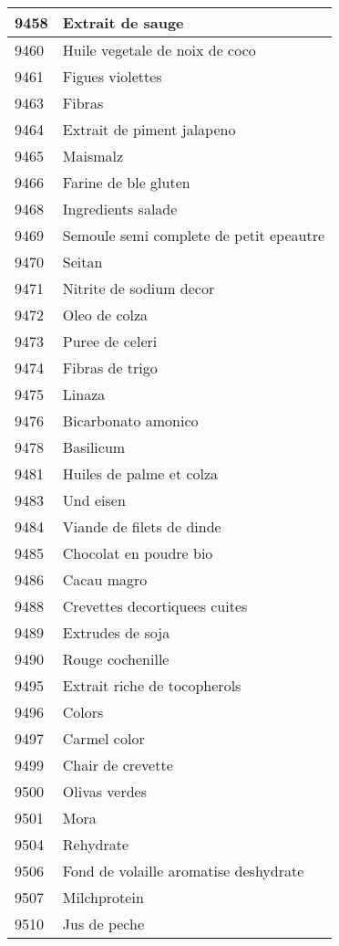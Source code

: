 \begin{longtable}{|l|l|}
9458 & Extrait de sauge \\ \hline 
9460 & Huile vegetale de noix de coco \\ \hline 
9461 & Figues violettes \\ \hline 
9463 & Fibras \\ \hline 
9464 & Extrait de piment jalapeno \\ \hline 
9465 & Maismalz \\ \hline 
9466 & Farine de ble gluten \\ \hline 
9468 & Ingredients salade \\ \hline 
9469 & Semoule semi complete de petit epeautre \\ \hline 
9470 & Seitan \\ \hline 
9471 & Nitrite de sodium decor \\ \hline 
9472 & Oleo de colza \\ \hline 
9473 & Puree de celeri \\ \hline 
9474 & Fibras de trigo \\ \hline 
9475 & Linaza \\ \hline 
9476 & Bicarbonato amonico \\ \hline 
9478 & Basilicum \\ \hline 
9481 & Huiles de palme et colza \\ \hline 
9483 & Und eisen \\ \hline 
9484 & Viande de filets de dinde \\ \hline 
9485 & Chocolat en poudre bio \\ \hline 
9486 & Cacau magro \\ \hline 
9488 & Crevettes decortiquees cuites \\ \hline 
9489 & Extrudes de soja \\ \hline 
9490 & Rouge cochenille \\ \hline 
9495 & Extrait riche de tocopherols \\ \hline 
9496 & Colors \\ \hline 
9497 & Carmel color \\ \hline 
9499 & Chair de crevette \\ \hline 
9500 & Olivas verdes \\ \hline 
9501 & Mora \\ \hline 
9504 & Rehydrate \\ \hline 
9506 & Fond de volaille aromatise deshydrate \\ \hline 
9507 & Milchprotein \\ \hline 
9510 & Jus de peche \\ \hline 

\end{longtable}
